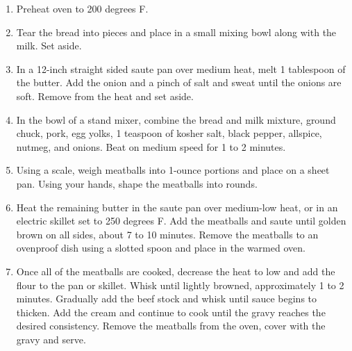 \begin{enumerate}
    \item Preheat oven to 200 degrees F.
    \item Tear the bread into pieces and place in a small mixing bowl along with the milk. Set aside.
    \item In a 12-inch straight sided saute pan over medium heat, melt 1 tablespoon of the butter. Add the onion and a pinch of salt and sweat until the onions are soft. Remove from the heat and set aside.
    \item In the bowl of a stand mixer, combine the bread and milk mixture, ground chuck, pork, egg yolks, 1 teaspoon of kosher salt, black pepper, allspice, nutmeg, and onions. Beat on medium speed for 1 to 2 minutes.
    \item Using a scale, weigh meatballs into 1-ounce portions and place on a sheet pan. Using your hands, shape the meatballs into rounds.
    \item Heat the remaining butter in the saute pan over medium-low heat, or in an electric skillet set to 250 degrees F. Add the meatballs and saute until golden brown on all sides, about 7 to 10 minutes. Remove the meatballs to an ovenproof dish using a slotted spoon and place in the warmed oven.
    \item Once all of the meatballs are cooked, decrease the heat to low and add the flour to the pan or skillet. Whisk until lightly browned, approximately 1 to 2 minutes. Gradually add the beef stock and whisk until sauce begins to thicken. Add the cream and continue to cook until the gravy reaches the desired consistency. Remove the meatballs from the oven, cover with the gravy and serve.


\end{enumerate}
